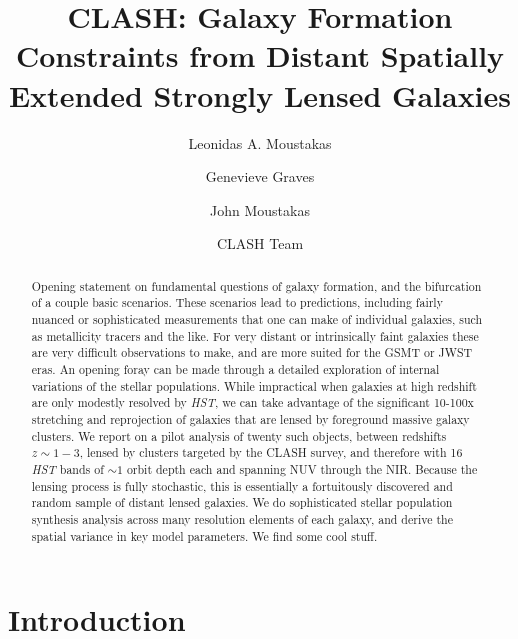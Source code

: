 \documentclass{emulateapj}
\begin{document}


\submitted{}


\title{CLASH: Galaxy Formation Constraints from Distant Spatially Extended Strongly Lensed Galaxies} 

\author{Leonidas A. Moustakas}
\author{Genevieve Graves}
\author{John Moustakas}
\author{CLASH Team}

\begin{abstract}
Opening statement on fundamental questions of galaxy formation, and
the bifurcation of a couple basic scenarios.  These scenarios lead to
predictions, including fairly nuanced or sophisticated measurements
that one can make of individual galaxies, such as metallicity tracers
and the like.  For very distant or intrinsically faint galaxies these
are very difficult observations to make, and are more suited for the
GSMT or JWST eras. An opening foray can be made through a detailed
exploration of internal variations of the stellar populations. While
impractical when galaxies at high redshift are only modestly resolved
by \emph{HST}, we can take advantage of the significant 10-100x
stretching and reprojection of galaxies that are lensed by foreground
massive galaxy clusters. We report on a pilot analysis of twenty such
objects, between redshifts $z\sim1-3$, lensed by clusters targeted by
the CLASH survey, and therefore with 16 \emph{HST} bands of $\sim1$
orbit depth each and spanning NUV through the NIR.  Because the
lensing process is fully stochastic, this is essentially a
fortuitously discovered and random sample of distant lensed
galaxies. We do sophisticated stellar population synthesis analysis
across many resolution elements of each galaxy, and derive the
spatial variance in key model parameters. We find some cool stuff. 
\end{abstract}

\section{Introduction} 

\end{document}
